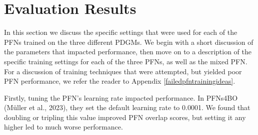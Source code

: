 \documentclass[12pt,twoside]{reedthesis}
\begin{document}
\hypertarget{evalResults}{%
\section{Evaluation Results}\label{evalResults}}

In this section we discuss the specific settings that were used for each of the PFNs trained on the three different PDGMs. We begin with a short discussion of the parameters that impacted performance, then move on to a description of the specific training settings for each of the three PFNs, as well as the mixed PFN. For a discussion of training techniques that were attempted, but yielded poor PFN performance, we refer the reader to Appendix \ref{failedpfntrainingideas}.

Firstly, tuning the PFN's learning rate impacted performance. In PFNs4BO (Müller et al., 2023), they set the default learning rate to 0.0001. We found that doubling or tripling this value improved PFN overlap scores, but setting it any higher led to much worse performance.
\end{document}
